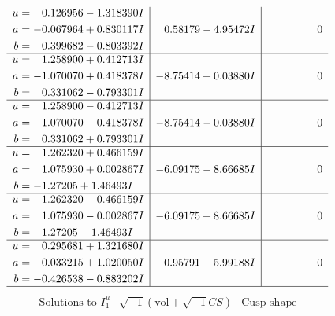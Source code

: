 \documentclass[1p]{elsarticle_modified}
\theoremstyle{definition}
\newcommand{\I}{\sqrt{-1}}
\begin{document}
$$\begin{array}{c|c|c}
\begin{aligned}
u &= \phantom{-}0.126956 - 1.318390 I \\
a &= -0.067964 + 0.830117 I \\
b &= \phantom{-}0.399682 - 0.803392 I\end{aligned}
 & \phantom{-}0.58179 - 4.95472 I & \phantom{-0.000000 } 0 \\ \hline\begin{aligned}
u &= \phantom{-}1.258900 + 0.412713 I \\
a &= -1.070070 + 0.418378 I \\
b &= \phantom{-}0.331062 - 0.793301 I\end{aligned}
 & -8.75414 + 0.03880 I & \phantom{-0.000000 } 0 \\ \hline\begin{aligned}
u &= \phantom{-}1.258900 - 0.412713 I \\
a &= -1.070070 - 0.418378 I \\
b &= \phantom{-}0.331062 + 0.793301 I\end{aligned}
 & -8.75414 - 0.03880 I & \phantom{-0.000000 } 0 \\ \hline\begin{aligned}
u &= \phantom{-}1.262320 + 0.466159 I \\
a &= \phantom{-}1.075930 + 0.002867 I \\
b &= -1.27205 + 1.46493 I\end{aligned}
 & -6.09175 - 8.66685 I & \phantom{-0.000000 } 0 \\ \hline\begin{aligned}
u &= \phantom{-}1.262320 - 0.466159 I \\
a &= \phantom{-}1.075930 - 0.002867 I \\
b &= -1.27205 - 1.46493 I\end{aligned}
 & -6.09175 + 8.66685 I & \phantom{-0.000000 } 0 \\ \hline\begin{aligned}
u &= \phantom{-}0.295681 + 1.321680 I \\
a &= -0.033215 + 1.020050 I \\
b &= -0.426538 - 0.883202 I\end{aligned}
 & \phantom{-}0.95791 + 5.99188 I & \phantom{-0.000000 } 0\\
 \hline 
 \end{array}$$\newpage$$\begin{array}{c|c|c}  
\text{Solutions to }I^u_{1}& \I (\text{vol} + \sqrt{-1}CS) & \text{Cusp shape}\\
 \hline 
\begin{aligned}

\end{aligned}
\end{array}$$
\end{document}
